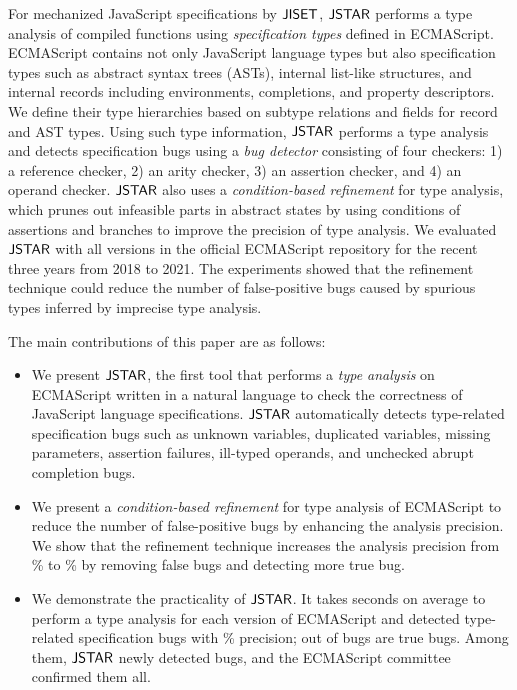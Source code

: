 For mechanized JavaScript specifications by $\jiset$, $\tool$ performs
a type analysis of compiled functions using \textit{specification types}
defined in ECMAScript. ECMAScript contains not only JavaScript
language types but also specification types such as abstract syntax
trees (ASTs), internal list-like structures, and internal records
including environments, completions, and property descriptors. We
define their type hierarchies based on subtype relations and fields for record and AST types.
Using such type information, $\tool$ performs a type analysis and detects specification bugs using
a \textit{bug detector} consisting of four checkers: 1) a reference
checker, 2) an arity checker, 3) an assertion checker, and 4) an operand checker.
$\tool$ also uses a \textit{condition-based refinement} for type
analysis, which prunes out infeasible parts in abstract states by using conditions
of assertions and branches to improve the precision of type analysis.
We evaluated $\tool$ with all  versions in the official
ECMAScript repository for the recent three years from 2018 to 2021.
The experiments showed that the refinement technique could reduce the number of
false-positive bugs caused by spurious types inferred by imprecise type analysis.

The main contributions of this paper are as follows:
\begin{itemize}
  \item We present $\tool$, the first tool that performs a \textit{type
    analysis} on ECMAScript written in a natural language to check the correctness of JavaScript language
    specifications.  $\tool$ automatically detects type-related specification
    bugs such as unknown variables, duplicated variables, missing
    parameters, assertion failures, ill-typed operands, and unchecked
    abrupt completion bugs.
  \item We present a \textit{condition-based refinement} for type analysis of
    ECMAScript to reduce the number of false-positive bugs by enhancing the analysis
    precision.  We show that the refinement technique increases the analysis
    precision from \% to \% by removing 
    false bugs and detecting  more true bug.
  \item We demonstrate the practicality of $\tool$. It takes 
    seconds on average to perform a type analysis for each version of ECMAScript and detected
     type-related specification bugs with \% precision;
     out of  bugs are true bugs.  Among them, $\tool$
    newly detected  bugs, and the ECMAScript committee confirmed them all.
\end{itemize}
